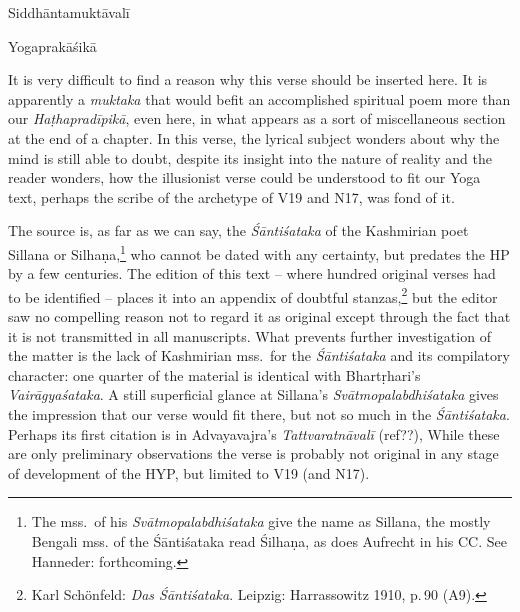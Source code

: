 \begin{ekdosis}
\begin{testimonia}[hp01_055_3]
Siddhāntamuktāvalī

\begin{versinnote}
\end{versinnote}

Yogaprakāśikā

\begin{versinnote}
\end{versinnote}

\end{testimonia}

\begin{philcomm}[hp01_055_3]
It is very difficult to find a reason why this verse should be inserted here. It is apparently a
\emph{muktaka} that would befit an accomplished spiritual poem more than our \emph{Haṭhapradīpikā},
even here, in what appears as a sort of miscellaneous section at the end of a chapter.  In this
verse, the lyrical subject wonders about why the mind is still able to doubt, despite its insight
into the nature of reality and the reader wonders, how the illusionist verse could be understood to
fit our Yoga text, perhaps the scribe of the archetype of V19 and N17, was fond of it.

The source is, as far as we can say, the \emph{Śāntiśataka} of the Kashmirian poet Sillana or
Silhaṇa,\footnote{The mss.\ of his \emph{Svātmopalabdhiśataka} give the name as Sillana, the mostly
Bengali mss. of the Śāntiśataka read Śilhaṇa, as does Aufrecht in his CC. See Hanneder:
forthcoming.} who cannot be dated with any certainty, but predates the HP by a few centuries. The
edition of this text – where hundred original verses had to be identified – places it into an
appendix of doubtful stanzas,\footnote{Karl Schönfeld: \emph{Das Śāntiśataka}. Leipzig:
Harrassowitz 1910, p.\,90 (A9).} but the editor saw no compelling reason not to regard it as
original except through the fact that it is not transmitted in all manuscripts.  What prevents
further investigation of the matter is the lack of Kashmirian mss.\ for the \emph{Śāntiśataka} and
its compilatory character: one quarter of the material is identical with Bhartṛhari's
\emph{Vairāgyaśataka}. A still superficial glance at Sillana's \emph{Svātmopalabdhiśataka} gives
the impression that our verse would fit there, but not so much in the \emph{Śāntiśataka}. Perhaps its first citation is in Advayavajra’s \emph{Tattva\-ratnāvalī} (ref??),  While
these are only preliminary observations the verse is probably not original in any stage of
development of the HYP, but limited to V19 (and N17).
\end{philcomm}


\end{ekdosis}
